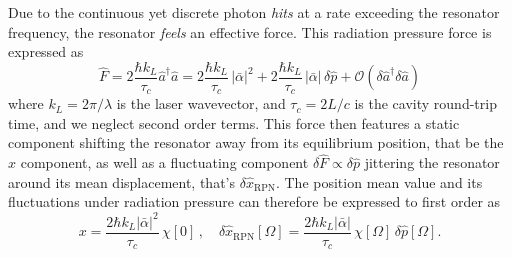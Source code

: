 Due to the continuous yet discrete photon \textit{hits} at a rate exceeding the resonator frequency, the resonator \textit{feels} an effective force. This radiation pressure force is expressed as 
\begin{equation}
  \hat F = 2 \frac{\hbar k_L}{\tau_c}\hat{a}^\dagger \hat{a} = 2 \frac{\hbar k_L}{\tau_c} \, |\bar{\alpha}|^2 +2 \frac{\hbar k_L}{\tau_c} \, |\bar \alpha| \, \delta \hat{p} + \mathcal{O}(\delta \hat{a}^\dagger \delta \hat{a})
\label{eq:Frad}
\end{equation}
where $k_L = 2\pi / \lambda$ is the laser wavevector, and $\tau_c=2L/c$ is the cavity round-trip time, and we neglect second order terms. This force then features a static component shifting the resonator away from its equilibrium position, that be the $x$ component, as well as a fluctuating component $\delta \hat F\propto \delta \hat{p}$ jittering the resonator around its mean displacement, that's $\delta \hat x_{\mathrm{RPN}}$. The position mean value and its fluctuations under radiation pressure can therefore be expressed to first order as 
\begin{equation}
  x = \frac{2\hbar k_L |\bar \alpha|^2}{\tau_c}  \,  \chi[0] \, , \quad \delta \hat x_{\mathrm{RPN}} [\Omega]= \frac{2\hbar k_L |\bar \alpha|}{\tau_c}  \,  \chi[\Omega] \,  \delta \hat{p}[\Omega]. \label{eq:dx}
\end{equation} 



